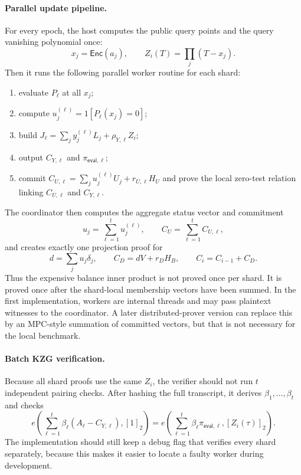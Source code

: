 \documentclass[UTF8,a4paper,11pt]{ctexart}
\newcommand{\Enc}{\mathsf{Enc}}
\begin{document}
\paragraph{Parallel update pipeline.}
For every epoch, the host computes the public query points and the query vanishing polynomial once:
\[
  x_j=\Enc(a_j),\qquad Z_i(T)=\prod_j(T-x_j).
\]
Then it runs the following parallel worker routine for each shard:
\begin{enumerate}[leftmargin=2em]
  \item evaluate $P_\ell$ at all $x_j$;
  \item compute $u_j^{(\ell)}=1[P_\ell(x_j)=0]$;
  \item build $J_\ell=\sum_j y_j^{(\ell)}L_j+\rho_{Y,\ell}Z_i$;
  \item output $C_{Y,\ell}$ and $\pi_{\mathsf{eval},\ell}$;
  \item commit $C_{U,\ell}=\sum_j u_j^{(\ell)}U_j+r_{U,\ell}H_U$ and prove the local zero-test
        relation linking $C_{U,\ell}$ and $C_{Y,\ell}$.
\end{enumerate}
The coordinator then computes the aggregate status vector and commitment
\[
  u_j=\sum_{\ell=1}^{t}u_j^{(\ell)},
  \qquad
  C_U=\sum_{\ell=1}^{t}C_{U,\ell},
\]
and creates exactly one projection proof for
\[
  d=\sum_j u_j\delta_j,
  \qquad
  C_D=dV+r_DH_B,
  \qquad
  C_i=C_{i-1}+C_D.
\]
Thus the expensive balance inner product is not proved once per shard.  It is proved once after the
shard-local membership vectors have been summed.  In the first implementation, workers are internal
threads and may pass plaintext witnesses to the coordinator.  A later distributed-prover version can
replace this by an MPC-style summation of committed vectors, but that is not necessary for the local
benchmark.

\paragraph{Batch KZG verification.}
Because all shard proofs use the same $Z_i$, the verifier should not run $t$ independent pairing
checks.  After hashing the full transcript, it derives $\beta_1,\ldots,\beta_t$ and checks
\[
  e\!\left(\sum_{\ell=1}^{t}\beta_\ell(A_\ell-C_{Y,\ell}),[1]_2\right)
  =
  e\!\left(\sum_{\ell=1}^{t}\beta_\ell\pi_{\mathsf{eval},\ell},[Z_i(\tau)]_2\right).
\]
The implementation should still keep a debug flag that verifies every shard separately, because this
makes it easier to locate a faulty worker during development.
\end{document}
